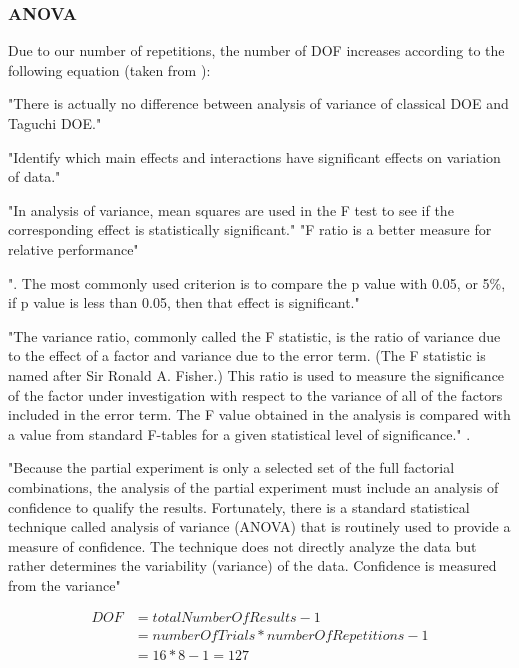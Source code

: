 \subsubsection{ANOVA}
Due to our number of repetitions, the number of DOF increases according to the following equation (taken from \cite{roy_primer_1990}):

"There is actually no difference between analysis of variance of classical DOE and Taguchi DOE."\cite{yang_design_2009}


"Identify which main effects and interactions have significant effects on variation of data."\cite{yang_design_2009}

"In analysis of variance, mean squares are used in the F test to see if the corresponding effect is statistically significant."\cite{yang_design_2009}
"F ratio is a better measure for relative performance"\cite{yang_design_2009}

". The most commonly used criterion is to compare the p value with 0.05, or 5\%, if p value is less than 0.05, then that effect is significant."\cite{yang_design_2009}

"The variance ratio, commonly called the F statistic, is the ratio of variance due to the effect of a factor and variance due to the error term. (The F statistic is named after Sir Ronald A. Fisher.) This ratio is used to measure the significance of the factor under investigation with respect to the variance of all of the factors included in the error term. The F value obtained in the analysis is compared with a value from standard F-tables for a given statistical level of significance." \cite{roy_primer_1990}.

"Because the partial experiment is only a selected set of the full factorial combinations, the analysis of the partial experiment must include an analysis of confidence to qualify the results. Fortunately, there is a standard statistical technique called analysis of variance (ANOVA) that is routinely used to provide a measure of confidence. The technique does not directly analyze the data but rather determines the variability (variance) of the data. Confidence is measured from the variance"\cite{roy_primer_1990}

\begin{equation} \label{full DOF}
	\begin{split}
		DOF & = totalNumberOfResults - 1 \\
		& = numberOfTrials * numberOfRepetitions - 1 \\
		& = 16 * 8 - 1 = 127
	\end{split}
\end{equation}




